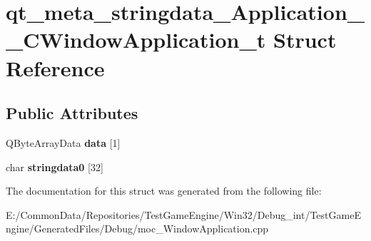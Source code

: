 \hypertarget{structqt__meta__stringdata___application_____c_window_application__t}{}\section{qt\+\_\+meta\+\_\+stringdata\+\_\+\+Application\+\_\+\+\_\+\+C\+Window\+Application\+\_\+t Struct Reference}
\label{structqt__meta__stringdata___application_____c_window_application__t}
\subsection*{Public Attributes}
\begin{DoxyCompactItemize}
\item 
\mbox{\label{structqt__meta__stringdata___application_____c_window_application__t_a305f1a28e98a74196f9061bfb8b62c8f}} 
Q\+Byte\+Array\+Data {\bfseries data} \mbox{[}1\mbox{]}
\item 
\mbox{\label{structqt__meta__stringdata___application_____c_window_application__t_a60d2e928c3abfb32e3f1335e4667b35c}} 
char {\bfseries stringdata0} \mbox{[}32\mbox{]}
\end{DoxyCompactItemize}


The documentation for this struct was generated from the following file\+:\begin{DoxyCompactItemize}
\item 
E\+:/\+Common\+Data/\+Repositories/\+Test\+Game\+Engine/\+Win32/\+Debug\+\_\+int/\+Test\+Game\+Engine/\+Generated\+Files/\+Debug/moc\+\_\+\+Window\+Application.\+cpp\end{DoxyCompactItemize}
